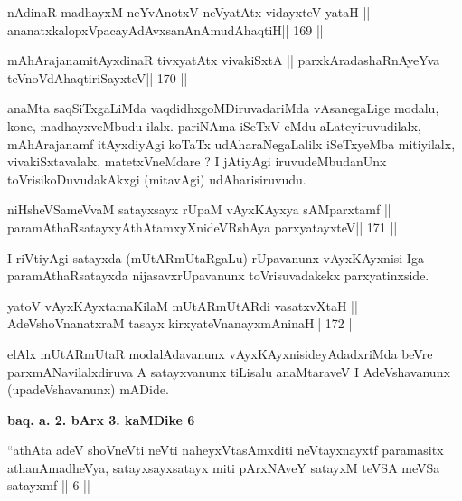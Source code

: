 \begin{shl}
nA\s\s dinaR madhayxM neYvAnotxV neVyatAtx vidayxteV yataH ||
ananatxkalopxVpacayAdAvxsanAnAmudAhaqtiH\hfill || 169 ||
\end{shl}

\begin{shl}
mAhArajanamitAyxdinaR tivxyatAtx vivakiSxtA ||
parxkAradashaRnAyeYva teVnoVdAhaqtiriSayxteV\hfill || 170 ||
\end{shl}

\begin{artha}
anaMta saqSiTxgaLiMda vaqdidhxgoMDiruvadariMda vAsanegaLige modalu,
kone, madhayxveMbudu ilalx. pariNAma iSeTxV eMdu aLateyiruvudilalx,
mAhArajanamf itAyxdiyAgi koTaTx udAharaNegaLalilx iSeTxyeMba
mitiyilalx, vivakiSxtavalalx, matetxVneMdare ? I jAtiyAgi
iruvudeMbudanUnx toVrisikoDuvudakAkxgi (mitavAgi) udAharisiruvudu.
\end{artha}

\begin{shl}
niHsheVSameVvaM satayxsayx rUpaM vAyxKAyxya sAMparxtamf ||
paramAthaRsatayxyAthAtamxyXnideVRshAya parxyatayxteV\hfill || 171 ||
\end{shl}

\begin{artha}
I riVtiyAgi satayxda (mUtARmUtaRgaLu) rUpavanunx vAyxKAyxnisi Iga
paramAthaRsatayxda nijasavxrUpavanunx toVrisuvadakekx parxyatinxside.
\end{artha}

\begin{shl}
yatoV vAyxKAyxtamaKilaM mUtARmUtARdi vasatxvXtaH ||
AdeVshoV\s nanatxraM tasayx kirxyateV\s nanayxmAninaH\hfill || 172 ||
\end{shl}

\begin{artha}
elAlx mUtARmUtaR modalAdavanunx vAyxKAyxnisideyAdadxriMda beVre
parxmANavilalxdiruva A satayxvanunx tiLisalu anaMtaraveV I
AdeVshavanunx (upadeVshavanunx) mADide.
\end{artha}

\begin{center}
\textbf{baq. a. 2. bArx 3. kaMDike 6}
\end{center}

\begin{artha}
``athAta adeV shoVneVti neVti naheyxVtasAmxditi neVtayxnayxtf
  paramasitx athanAmadheVya, satayxsayxsatayx miti pArxNAveY satayxM
  teVSA meVSa satayxmf || 6 ||
\end{artha}

